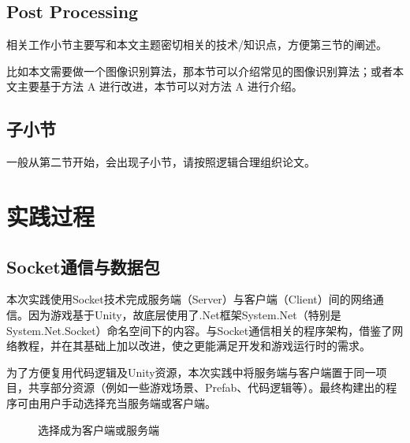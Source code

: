 \documentclass[conference]{IEEEtran}
\begin{document}
\subsection{Post Processing}



相关工作小节主要写和本文主题密切相关的技术/知识点，方便第三节的阐述。

比如本文需要做一个图像识别算法，那本节可以介绍常见的图像识别算法；或者本文主要基于方法 A 进行改进，本节可以对方法 A 进行介绍。

\subsection{子小节}

一般从第二节开始，会出现子小节，请按照逻辑合理组织论文。

\section{实践过程}

\subsection{Socket通信与数据包}
本次实践使用Socket技术完成服务端（Server）与客户端（Client）间的网络通信。因为游戏基于Unity，故底层使用了.Net框架System.Net（特别是System.Net.Socket）命名空间下的内容。与Socket通信相关的程序架构，借鉴了网络教程\cite{myCite:Tom}，并在其基础上加以改进，使之更能满足开发和游戏运行时的需求。

为了方便复用代码逻辑及Unity资源，本次实践中将服务端与客户端置于同一项目，共享部分资源（例如一些游戏场景、Prefab、代码逻辑等）。最终构建出的程序可由用户手动选择充当服务端或客户端。

\begin{figure}[h!]  
	\setlength{\abovecaptionskip}{.2cm}   %
	\setlength{\belowcaptionskip}{0cm}   %
    \centering  %
    \caption{选择成为客户端或服务端}
    \label{fig:beCS}
\end{figure}
\end{document}
